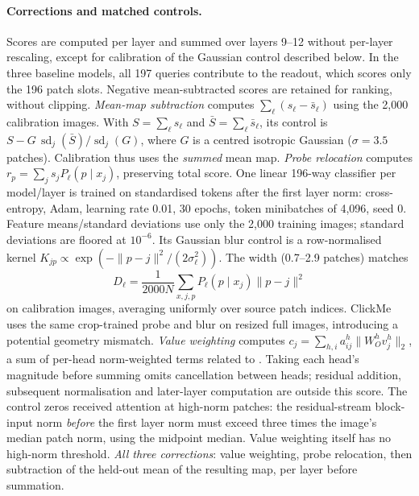 \paragraph{Corrections and matched controls.} Scores are computed per layer and summed over layers 9--12 without per-layer rescaling, except for calibration of the Gaussian control described below. In the three baseline models, all 197 queries contribute to the readout, which scores only the 196 patch slots. Negative mean-subtracted scores are retained for ranking, without clipping.
\emph{Mean-map subtraction} computes $\sum_\ell(s_\ell-\bar s_\ell)$ using the 2,000 calibration images. With $S=\sum_\ell s_\ell$ and $\bar S=\sum_\ell\bar s_\ell$, its control is $S-G\,\operatorname{sd}_j(\bar S)/\operatorname{sd}_j(G)$, where $G$ is a centred isotropic Gaussian ($\sigma=3.5$ patches). Calibration thus uses the \emph{summed} mean map.
\emph{Probe relocation} computes \mbox{$r_p=\sum_j s_jP_\ell(p\mid x_j)$}, preserving total score. One linear 196-way classifier per model/layer is trained on standardised tokens after the first layer norm: cross-entropy, Adam, learning rate 0.01, 30 epochs, token minibatches of 4,096, seed 0. Feature means/standard deviations use only the 2,000 training images; standard deviations are floored at $10^{-6}$. Its Gaussian blur control is a row-normalised kernel $K_{jp}\propto\exp(-\lVert p-j\rVert^2/(2\sigma_\ell^2))$. The width (0.7--2.9 patches) matches
\[
D_\ell=\frac{1}{2000N}\sum_{x,j,p}P_\ell(p\mid x_j)\lVert p-j\rVert^2
\]
on calibration images, averaging uniformly over source patch indices. ClickMe uses the same crop-trained probe and blur on resized full images, introducing a potential geometry mismatch.
\emph{Value weighting} computes $c_j=\sum_{h,i}a_{ij}^h\lVert W_O^hv_j^h\rVert_2$, a sum of per-head norm-weighted terms related to \citet{kobayashi2020}. Taking each head's magnitude before summing omits cancellation between heads; residual addition, subsequent normalisation and later-layer computation are outside this score. The control zeros received attention at high-norm patches: the residual-stream block-input norm \emph{before} the first layer norm must exceed three times the image's median patch norm, using the midpoint median. Value weighting itself has no high-norm threshold.
\emph{All three corrections}: value weighting, probe relocation, then subtraction of the held-out mean of the resulting map, per layer before summation.

